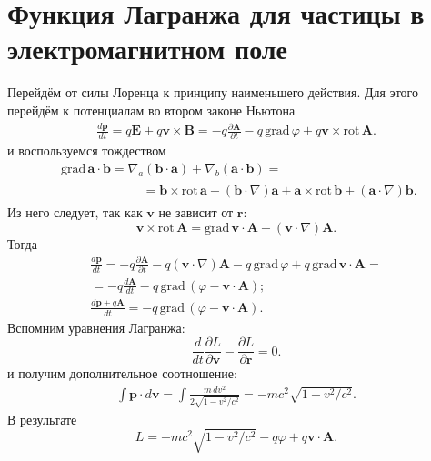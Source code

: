 \documentclass[a4paper,14pt]{extreport} %
\newcommand{\dff}[2]{\frac{\partial #1}{\partial #2}}
\newcommand{\Df}[1]{\frac{d}{d #1}}
\newcommand{\Dff}[2]{\frac{d #1}{d #2}}
\renewcommand{\vec}[1]{\boldsymbol{#1}}
\newcommand{\rot}{\mathrm{rot}\,}
\newcommand{\grad}{\mathrm{grad}\,}
\begin{document}
	\section{Функция Лагранжа для частицы в электромагнитном поле}
	
	Перейдём от силы Лоренца к принципу наименьшего действия. Для этого перейдём к потенциалам во втором законе Ньютона
	\begin{gather*}
		\Dff{\vec{p}}{t} = q \vec{E} + q \vec{v} \times \vec{B} = - q \dff{\vec{A}}{t} - q\, \grad \varphi + q \vec{v} \times \rot \vec{A}.
	\end{gather*}
	и воспользуемся тождеством
	\begin{align*}
		&\grad \vec{a} \cdot \vec{b} = \nabla_a(\vec{b}\cdot\vec{a}) + \nabla_b(\vec{a}\cdot\vec{b}) = \\
		&\begin{gathered} 
		\qquad \qquad \qquad = \vec{b}\times\rot \vec{a} + (\vec{b}\cdot\nabla)\vec{a} + \vec{a}\times\rot \vec{b} + (\vec{a}\cdot\nabla)\vec{b}.
		\end{gathered}
	\end{align*}
	Из него следует, так как $\vec{v}$ не зависит от $\vec{r}$:
	\begin{equation*}
		\vec{v}\times\rot\vec{A} = \grad \vec{v}\cdot\vec{A} - (\vec{v}\cdot\nabla)\vec{A}.
	\end{equation*}
	Тогда
	\begin{gather*}
		\Dff{\vec{p}}{t} = - q \dff{\vec{A}}{t} - q (\vec{v}\cdot\nabla)\vec{A} - q\, \grad \varphi + q\,\grad \vec{v}\cdot\vec{A} = \\ =
		- q \Dff{\vec{A}}{t} - q\, \grad \left(\varphi - \vec{v}\cdot\vec{A} \right); \\
		\Dff{\vec{p} + q \vec{A}}{t} = - q\, \grad \left(\varphi - \vec{v}\cdot\vec{A} \right).
	\end{gather*}
	Вспомним уравнения Лагранжа:
	\begin{equation*}
		\Df{t} \dff{L}{\vec{v}} - \dff{L}{\vec{r}} = 0.
	\end{equation*}
	и получим дополнительное соотношение:
	\begin{gather*}
		\int\vec{p}\cdot d\vec{v} = \int \frac{m\, dv^2}{2\sqrt{1 - v^2/c^2}} = - mc^2 \sqrt{1 - v^2/c^2}.
	\end{gather*}
	В результате
	\begin{equation*}
		L = - mc^2 \sqrt{1 - v^2/c^2} - q \varphi + q \vec{v}\cdot\vec{A}.
	\end{equation*}
	
\end{document}
